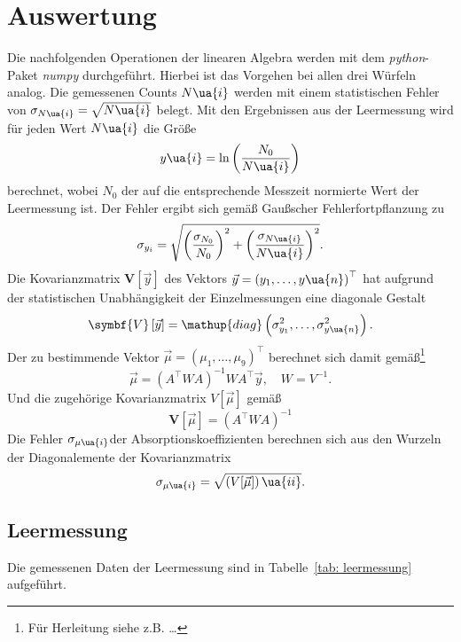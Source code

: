 \section{Auswertung}
Die nachfolgenden Operationen der linearen Algebra werden mit dem \emph{python}-Paket
\emph{numpy}\cite{} durchgeführt. Hierbei ist das Vorgehen bei allen drei Würfeln
analog. Die gemessenen Counts $N\ua{i}$ werden mit einem statistischen Fehler
von $\sigma_{N\ua{i}} = \sqrt{N\ua{i}}$ belegt. Mit den Ergebnissen aus
der Leermessung wird für jeden Wert $N\ua{i}$ die Größe
\begin{equation}
  y\ua{i} = \ln\left(\frac{N_0}{N\ua{i}} \right)
\end{equation}
berechnet, wobei $N_0$ der auf die entsprechende Messzeit normierte Wert der Leermessung ist.
Der Fehler ergibt sich gemäß Gaußscher Fehlerfortpflanzung zu
\begin{equation}
  \sigma_{y_i} = \sqrt{\left(\frac{\sigma_{N_0}}{N_0} \right)^2 +    \left(\frac{\sigma_{N\ua{i}}}{N\ua{i}} \right)^2}.
\end{equation}
Die Kovarianzmatrix $\symbf{V}\left[\vec{y}\right]$ des Vektors $\vec{y} = \left(y_1, \dots , y\ua{n} \right)^\top$ hat aufgrund der statistischen Unabhängigkeit der
Einzelmessungen eine diagonale Gestalt
\begin{equation}
  \symbf{V}\left[\vec{y}\right] = \mathup{diag}\left(\sigma_{y_1}^2, \dots , \sigma_{y\ua{n}}^2 \right).
\end{equation}
Der zu bestimmende Vektor $\vec{\mu} = \left(\mu_1, \dots , \mu_9 \right)^\top$ berechnet sich damit gemäß\footnote{Für Herleitung siehe z.B. \dots}
\begin{equation}
  \vec{\mu} = \left(A^\top W A\right)^{-1} W A^\top \vec{y}, \quad W = V^{-1}.
\end{equation}
Und die zugehörige Kovarianzmatrix $V[\vec{\mu}]$ gemäß
\begin{equation}
  \symbf{V}\left[\vec{\mu}\right] = \left( A^\top W  A\right)^{-1}
\end{equation}
Die Fehler $\sigma_{\mu\ua{i}}$der Absorptionskoeffizienten berechnen sich aus den Wurzeln der Diagonalemente der Kovarianzmatrix
\begin{equation}
 \sigma_{\mu\ua{i}} = \sqrt{\left(V[\vec{\mu}]\right)\ua{ii}}.
\end{equation}





\subsection{Leermessung}
Die gemessenen Daten der Leermessung sind in Tabelle~\ref{tab: leermessung} aufgeführt.
%


